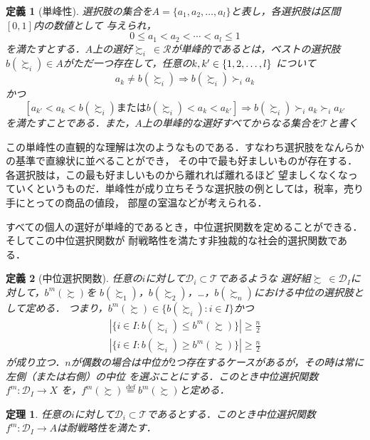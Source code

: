 \documentclass[dvipdfmx]{jsarticle}
\newtheorem*{THeorem}{定理}
\newtheorem*{DEfinition}{定義}
\begin{document}
\begin{DEfinition}[単峰性]
  選択肢の集合を$A = \{a_1, a_2, \ldots, a_{l}\}$と表し，各選択肢は区間$[0,1]$内の数値として
  与えられ，
  \[
    0 \leq a_1 < a_2 < \cdots < a_{l} \leq 1
  \]
  を満たすとする．$A$上の選好$\succsim_i \ \in \mathcal{R}$が単峰的であるとは，ベストの選択肢
  $b(\succsim_i) \in A$がただ一つ存在して，任意の$k, k' \in \{ 1, 2, \ldots, \mathnormal{l} \}$
  について
  \[
    a_k \neq b(\succsim_i) \Rightarrow b(\succsim_i) \succ_i a_k
  \]
  かつ
  \[
    [a_{k'} < a_{k} < b(\succsim_i) \text{または} b(\succsim_i) < a_{k} < a_{k'}]
    \Rightarrow b(\succsim_i) \succ_i a_{k} \succ_i a_{k'}
  \]
  を満たすことである．また，$A$上の単峰的な選好すべてからなる集合を$\mathcal{T}$と書く
\end{DEfinition}

この単峰性の直観的な理解は次のようなものである．すなわち選択肢をなんらかの基準で直線状に並べることができ，
その中で最も好ましいものが存在する．各選択肢は，この最も好ましいものから離れれば離れるほど
望ましくなくなっていくというものだ．単峰性が成り立ちそうな選択肢の例としては，税率，売り手にとっての商品の値段，
部屋の室温などが考えられる．

すべての個人の選好が単峰的であるとき，中位選択関数を定めることができる．そしてこの中位選択関数が
耐戦略性を満たす非独裁的な社会的選択関数である．

\begin{DEfinition}[中位選択関数]
  任意の$i$に対して$\mathcal{D}_i \subset \mathcal{T}$であるような
  選好組$\succsim \ \in \mathcal{D}_I$に対して，$b^m(\succsim)$を
  $b(\succsim_1)$，$b(\succsim_2)$，\ldots，$b(\succsim_n)$における中位の選択肢として定める．
  つまり，$b^m(\succsim) \in \{ b(\succsim_i):i \in I \}$かつ
  \begin{eqnarray*}
    | \{i \in I: b(\succsim_i) \leq b^m(\succsim) \} | \geq \frac{n}{2} \\
    | \{i \in I: b(\succsim_i) \geq b^m(\succsim) \} | \geq \frac{n}{2}
  \end{eqnarray*}
  が成り立つ．$n$が偶数の場合は中位が$2$つ存在するケースがあるが，その時は常に左側（または右側）の中位
  を選ぶことにする．このとき中位選択関数$f^m\colon \mathcal{D}_{I} \to X$
  を，$f^m(\succsim) \stackrel{\mathrm{def}}{=} b^m(\succsim)$と定める．
\end{DEfinition}

\begin{THeorem}
  任意の$i$に対して$\mathcal{D}_i \subset \mathcal{T}$であるとする．このとき中位選択関数
  $f^m\colon \mathcal{D}_I \to A$は耐戦略性を満たす．
\end{THeorem}
\end{document}
